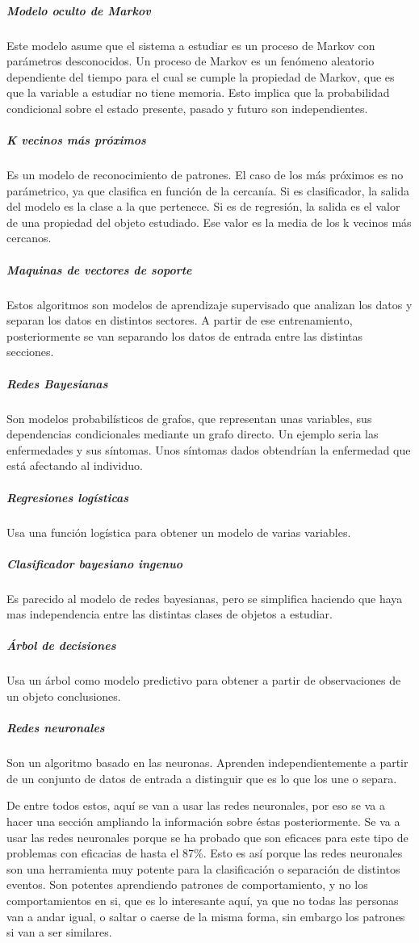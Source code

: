 \documentclass[12pt]{article}
\numberwithin{equation}{section}
\begin{document}
\subparagraph{Modelo oculto de Markov} Este modelo asume que el sistema a estudiar es un proceso de Markov con parámetros desconocidos. Un proceso de Markov es un fenómeno aleatorio dependiente del tiempo para el cual se cumple la propiedad de Markov, que es que la variable a estudiar no tiene memoria. Esto implica que la probabilidad condicional sobre el estado presente, pasado y futuro son independientes.

\subparagraph{K vecinos más próximos} Es un modelo de reconocimiento de patrones. El caso de los más próximos es no parámetrico, ya que clasifica en función de la cercanía. Si es clasificador, la salida del modelo es la clase a la que pertenece. Si es de regresión, la salida es el valor de una propiedad del objeto estudiado. Ese valor es la media de los k vecinos más cercanos.

\subparagraph{Maquinas de vectores de soporte} Estos algoritmos son modelos de aprendizaje supervisado que analizan los datos y separan los datos en distintos sectores. A partir de ese entrenamiento, posteriormente se van separando los datos de entrada entre las distintas secciones.

\subparagraph{Redes Bayesianas} Son modelos probabilísticos de grafos, que representan unas variables, sus dependencias condicionales mediante un grafo directo. Un ejemplo seria las enfermedades y sus síntomas. Unos síntomas dados obtendrían la enfermedad que está afectando al individuo.

\subparagraph{Regresiones logísticas} Usa una función logística para obtener un modelo de varias variables.

\subparagraph{Clasificador bayesiano ingenuo} Es parecido al modelo de redes bayesianas, pero se simplifica haciendo que haya mas independencia entre las distintas clases de objetos a estudiar.

\subparagraph{Árbol de decisiones} Usa un árbol como modelo predictivo para obtener a partir de observaciones de un objeto conclusiones.

\subparagraph{Redes neuronales} Son un algoritmo basado en las neuronas. Aprenden independientemente a partir de un conjunto de datos de entrada a distinguir que es lo que los une o separa.

De entre todos estos, aquí se van a usar las redes neuronales, por eso se va a hacer una sección ampliando la información sobre éstas posteriormente. Se va a usar las redes neuronales porque se ha probado que son eficaces para este tipo de problemas\cite{s131013099} con eficacias de hasta el 87\%. Esto es así porque las redes neuronales son una herramienta muy potente para la clasificación o separación de distintos eventos. Son potentes aprendiendo patrones de comportamiento, y no los comportamientos en si, que es lo interesante aquí, ya que no todas las personas van a andar igual, o saltar o caerse de la misma forma, sin embargo los patrones si van a ser similares.
\end{document}
